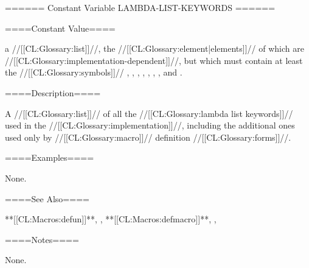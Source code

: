 ====== Constant Variable LAMBDA-LIST-KEYWORDS ======

====Constant Value====

a //[[CL:Glossary:list]]//, the //[[CL:Glossary:element|elements]]// of which are //[[CL:Glossary:implementation-dependent]]//, but which must contain at least the //[[CL:Glossary:symbols]]// , , , , , , , and .

====Description====

A //[[CL:Glossary:list]]// of all the //[[CL:Glossary:lambda list keywords]]// used in the //[[CL:Glossary:implementation]]//, including the additional ones used only by //[[CL:Glossary:macro]]// definition //[[CL:Glossary:forms]]//.

====Examples====

None.

====See Also====

**[[CL:Macros:defun]]**, , **[[CL:Macros:defmacro]]**, , {\secref\EvaluationModel}

====Notes====

None.

